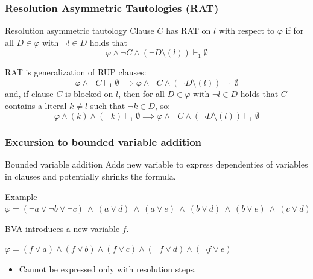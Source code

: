 \documentclass[xcolor=dvipsnames]{beamer}
\begin{document}
\begin{frame}
    \frametitle{Resolution Asymmetric Tautologies (RAT)}
    \begin{block}{Resolution asymmetric tautology}
    Clause $C$ has RAT on $l$  with respect to $\varphi$ if for all $D \in \varphi$ with $\neg l \in D$ holds that
    \[
        \varphi \wedge \neg C \wedge (\neg D \setminus (l)) \vdash_1 \emptyset
    \]
    \end{block}
    \pause
    RAT is generalization of RUP clauses:
    \[
        \varphi \wedge \neg C \vdash_1 \emptyset
        \implies \varphi \wedge \neg C \wedge (\neg D \setminus (l)) \vdash_1 \emptyset
    \]
    \pause
    and, if clause $C$ is blocked on $l$, then for all $D \in \varphi$ with $\neg l \in D$
    holds that $C$ contains a literal $k \neq l$ such that $\neg k \in D$, so:
    \[
        \varphi \wedge (k) \wedge (\neg k)  \vdash_1 \emptyset
        \implies \varphi \wedge \neg C \wedge (\neg D \setminus (l)) \vdash_1 \emptyset
    \]
\end{frame}

\begin{frame}
	\frametitle{Excursion to bounded variable addition}
	\begin{block}{Bounded variable addition}
		Adds new variable to express dependenties of variables in clauses and potentially shrinks the formula.
	\end{block}
	\begin{block}{Example}
        $
            \varphi = (\neg a \vee \neg b \vee \neg c) ~\wedge~ (a \vee d) ~\wedge~
  					  (a \vee e) ~\wedge~ (b \vee d) ~\wedge~ (b \vee e) ~\wedge~ (c \vee d)
		$

		\bigskip
		BVA introduces a new variable $f$.

		\bigskip
		$
			\varphi = (f \vee a) \wedge (f \vee b) \wedge (f \vee c) \wedge (\neg f \vee d)
					  \wedge (\neg f \vee e)
		$
	\end{block}

	\begin{itemize}
		\item Cannot be expressed  only with resolution steps.
	\end{itemize}
\end{frame}
\end{document}
